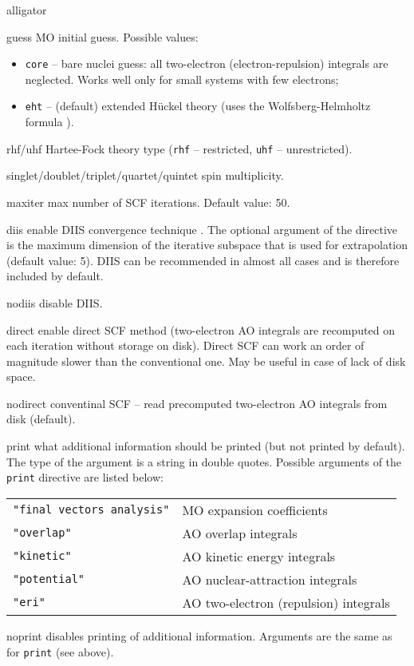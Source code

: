 \documentclass[a4paper, 12pt]{article}
\begin{document}
\begin{labeling}{alligator}
\item [guess] MO initial guess. Possible values:
	\begin{itemize}
	\item \texttt{core} -- bare nuclei guess: all two-electron (electron-repulsion) integrals are neglected. Works well only for small systems with few electrons;
	\item \texttt{eht} -- (default) extended H\"uckel theory \cite{hoffmann1963} (uses the Wolfsberg-Helmholtz formula \cite{wolfsberg1952}).
	\end{itemize}
\item [rhf/uhf] Hartee-Fock theory type (\texttt{rhf} -- restricted, \texttt{uhf} -- unrestricted).
\item [singlet/doublet/triplet/quartet/quintet] spin multiplicity.
\item [maxiter] max number of SCF iterations. Default value: 50.
\item [diis] enable DIIS convergence technique \cite{pulay1980,pulay1981}.
The optional argument of the directive is the maximum dimension of the iterative subspace that is used for extrapolation (default value: 5). DIIS can be recommended in almost all cases and is therefore included by default.
\item [nodiis] disable DIIS.
\item [direct] enable direct SCF method (two-electron AO integrals are recomputed on each iteration without storage on disk).
Direct SCF can work an order of magnitude slower than the conventional one. May be useful in case of lack of disk space.
\item [nodirect] conventinal SCF -- read precomputed two-electron AO integrals from disk (default).
\item [print]
what additional information should be printed (but not printed by default). The type of the argument is a string in double quotes. Possible arguments of the \texttt{print} directive are listed below:

{
\small
\begin{tabular}{|l|l|}
\hline
\texttt{"final vectors analysis"} & MO expansion coefficients \\
\texttt{"overlap"}   & AO overlap integrals \\
\texttt{"kinetic"}   & AO kinetic energy integrals \\
\texttt{"potential"} & AO nuclear-attraction integrals \\
\texttt{"eri"}       & AO two-electron (repulsion) integrals \\
\hline
\end{tabular}
}
\item [noprint] disables printing of additional information. Arguments are the same as for \texttt{print} (see above).
\end{labeling}
\end{document}
